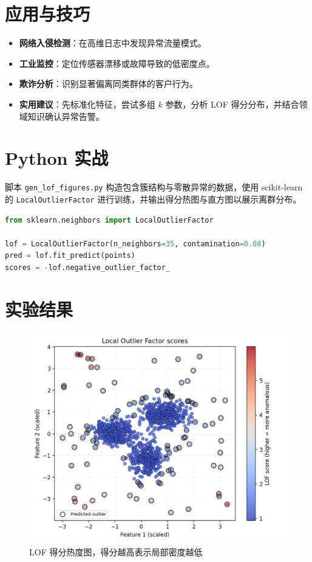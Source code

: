 \documentclass[UTF8,zihao=-4]{ctexart}
\begin{document}
\section{应用与技巧}
\begin{itemize}
  \item \textbf{网络入侵检测}：在高维日志中发现异常流量模式。
  \item \textbf{工业监控}：定位传感器漂移或故障导致的低密度点。
  \item \textbf{欺诈分析}：识别显著偏离同类群体的客户行为。
  \item \textbf{实用建议}：先标准化特征，尝试多组 \(k\) 参数，分析 LOF 得分分布，并结合领域知识确认异常告警。
\end{itemize}

\section{Python 实战}
脚本 \texttt{gen\_lof\_figures.py} 构造包含簇结构与零散异常的数据，使用 scikit-learn 的 \texttt{LocalOutlierFactor} 进行训练，并输出得分热图与直方图以展示离群分布。
\begin{lstlisting}[language=Python,caption={脚本 gen_lof_figures.py 片段}]
from sklearn.neighbors import LocalOutlierFactor

lof = LocalOutlierFactor(n_neighbors=35, contamination=0.08)
pred = lof.fit_predict(points)
scores = -lof.negative_outlier_factor_
\end{lstlisting}

\section{实验结果}
\begin{figure}[H]
  \centering
  \includegraphics[width=0.82\linewidth]{lof_decision_map.png}
  \caption{LOF 得分热度图，得分越高表示局部密度越低}
  \label{fig:lof_decision_map_cn}
\end{figure}
\end{document}

